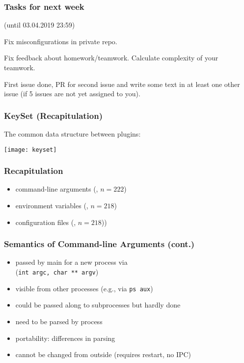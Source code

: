 \begin{assignment}
	\frametitle{Tasks for next week}
	(until 03.04.2019 23:59)

	\begin{task}
	Fix misconfigurations in private repo.
	\end{task}

	\begin{task}
	Fix feedback about homework/teamwork.
	Calculate complexity of your teamwork.
	\end{task}

	\begin{task}
	First issue done, PR for second issue and write some text in at least one other issue (if 5 issues are not yet assigned to you).
	\end{task}
\end{assignment}


\begin{frame}
	\frametitle{KeySet (Recapitulation)}

	The common data structure between plugins:
	\vspace{1cm}

	\texttt{[image: keyset]}
\end{frame}

\begin{frame}
	\frametitle{Recapitulation}

	\methodQuestion{} 
	\pause
	\begin{itemize}
	\item command-line arguments (, $n=222$)
	\item environment variables (, $n=218$)
	\item configuration files (, $n=218$))
	\end{itemize}
\end{frame}

\begin{frame}
	\frametitle{Semantics of Command-line Arguments (cont.)}
	\begin{itemize}
	\item passed by main for a new process via \\ (\texttt{int argc, char ** argv})
	\item visible from other processes (e.g., via \texttt{ps aux})
	\item could be passed along to subprocesses but hardly done
	\item need to be parsed by process
	\item portability: differences in parsing
	\item cannot be changed from outside (requires restart, no IPC)
	\end{itemize}
\end{frame}

